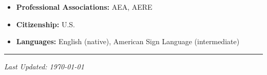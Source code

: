 \documentclass[11pt]{res} %
\begin{document}
\begin{resume}
\begin{itemize}
	\item[] \textbf{Professional Associations:} AEA, AERE
	\item[] \textbf{Citizenship:} U.S.
	\item[] \textbf{Languages:} English (native), American Sign Language (intermediate)
\end{itemize}
\hrule

\vspace{0.1in} %



\centerline{\emph{Last Updated: \today}}
\pagebreak



\end{resume}
\end{document}

